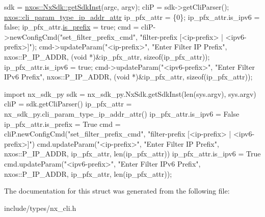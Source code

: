 \begin{DoxyCode}
sdk = \mbox{\hyperlink{classnxos_1_1_nx_sdk_a5050e2d26c40744b4fc7862068a83f39}{nxos::NxSdk::getSdkInst}}(argc, argv);
cliP = sdk->getCliParser();
\mbox{\hyperlink{structnxos_1_1cli__param__type__ip__addr__attr__}{nxos::cli\_param\_type\_ip\_addr\_attr}} ip\_pfx\_attr = \{0\};
ip\_pfx\_attr.is\_ipv6 = \textcolor{keyword}{false};
ip\_pfx\_attr.\mbox{\hyperlink{structnxos_1_1cli__param__type__ip__addr__attr___a0a059b592a9bc394c9fed521fb5a9552}{is\_prefix}} = \textcolor{keyword}{true};
cmd = cliP->newConfigCmd(\textcolor{stringliteral}{"set\_filter\_prefix\_cmd"},
                         \textcolor{stringliteral}{"filter-prefix [<ip-prefix> | <ipv6-prefix>]"});
cmd->updateParam(\textcolor{stringliteral}{"<ip-prefix>"}, \textcolor{stringliteral}{"Enter Filter IP Prefix"}, nxos::P\_IP\_ADDR,
                 (\textcolor{keywordtype}{void} *)&ip\_pfx\_attr, \textcolor{keyword}{sizeof}(ip\_pfx\_attr));
ip\_pfx\_attr.is\_ipv6 = \textcolor{keyword}{true};
cmd->updateParam(\textcolor{stringliteral}{"<ipv6-prefix>"}, \textcolor{stringliteral}{"Enter Filter IPv6 Prefix"}, nxos::P\_IP\_ADDR,
                 (\textcolor{keywordtype}{void} *)&ip\_pfx\_attr, \textcolor{keyword}{sizeof}(ip\_pfx\_attr));
\end{DoxyCode}



\begin{DoxyCode}
\textcolor{keyword}{import} nx\_sdk\_py
sdk = nx\_sdk\_py.NxSdk.getSdkInst(len(sys.argv), sys.argv)
cliP = sdk.getCliParser()
ip\_pfx\_attr = nx\_sdk\_py.cli\_param\_type\_ip\_addr\_attr()
ip\_pfx\_attr.is\_ipv6 = \textcolor{keyword}{False}
ip\_pfx\_attr.is\_prefix = \textcolor{keyword}{True}
cmd = cliP.newConfigCmd(\textcolor{stringliteral}{"set\_filter\_prefix\_cmd"},
                        \textcolor{stringliteral}{"filter-prefix [<ip-prefix> | <ipv6-prefix>]"})
cmd.updateParam(\textcolor{stringliteral}{"<ip-prefix>"}, \textcolor{stringliteral}{"Enter Filter IP Prefix"}, nxos::P\_IP\_ADDR,
                ip\_pfx\_attr, len(ip\_pfx\_attr))
ip\_pfx\_attr.is\_ipv6 = \textcolor{keyword}{True}
cmd.updateParam(\textcolor{stringliteral}{"<ipv6-prefix>"}, \textcolor{stringliteral}{"Enter Filter IPv6 Prefix"}, nxos::P\_IP\_ADDR,
                ip\_pfx\_attr, len(ip\_pfx\_attr));
\end{DoxyCode}
 

The documentation for this struct was generated from the following file\+:\begin{DoxyCompactItemize}
\item 
include/types/nx\+\_\+cli.\+h\end{DoxyCompactItemize}
